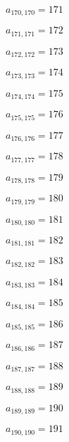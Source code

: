 \documentclass[a4paper,12pt]{article}
\begin{document}
$a _{ 170, 170 } = 171$

$a _{ 171, 171 } = 172$

$a _{ 172, 172 } = 173$

$a _{ 173, 173 } = 174$

$a _{ 174, 174 } = 175$

$a _{ 175, 175 } = 176$

$a _{ 176, 176 } = 177$

$a _{ 177, 177 } = 178$

$a _{ 178, 178 } = 179$

$a _{ 179, 179 } = 180$

$a _{ 180, 180 } = 181$

$a _{ 181, 181 } = 182$

$a _{ 182, 182 } = 183$

$a _{ 183, 183 } = 184$

$a _{ 184, 184 } = 185$

$a _{ 185, 185 } = 186$

$a _{ 186, 186 } = 187$

$a _{ 187, 187 } = 188$

$a _{ 188, 188 } = 189$

$a _{ 189, 189 } = 190$

$a _{ 190, 190 } = 191$
\end{document}
